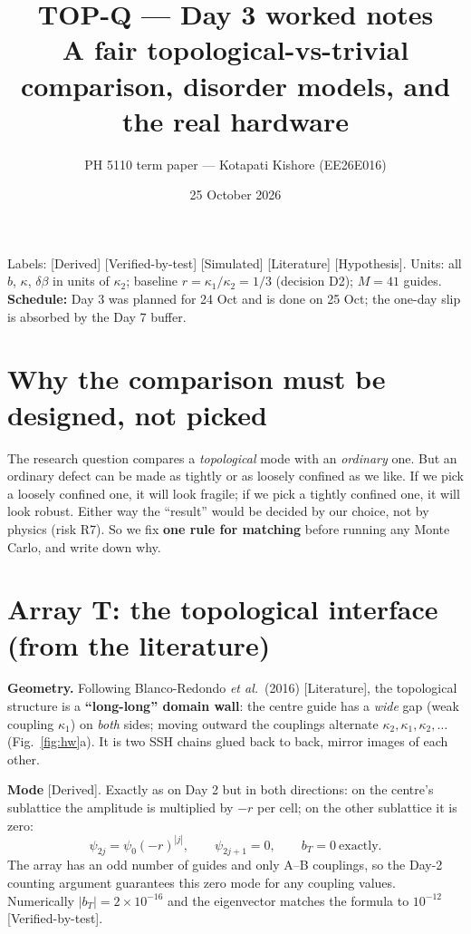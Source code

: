 \documentclass[10pt,a4paper]{article}
\title{TOP-Q --- Day 3 worked notes\\[2pt]\large A fair topological-vs-trivial comparison, disorder models, and the real hardware}
\author{PH 5110 term paper --- Kotapati Kishore (EE26E016)}
\date{25 October 2026}
\newcommand{\ka}{\kappa_1}
\newcommand{\kc}{\kappa_2}
\newcommand{\note}[1]{\par\smallskip\noindent\colorbox{gray!12}{\parbox{\dimexpr\linewidth-2\fboxsep}{\small #1}}\par\smallskip}
\newcommand{\evd}[1]{\textsf{\small[#1]}}
\begin{document}
\sloppy\maketitle

\note{Labels: \evd{Derived} \evd{Verified-by-test} \evd{Simulated} \evd{Literature} \evd{Hypothesis}.
Units: all $b$, $\kappa$, $\delta\beta$ in units of $\kc$; baseline $r=\ka/\kc=1/3$ (decision D2); $M=41$ guides.
\textbf{Schedule:} Day 3 was planned for 24 Oct and is done on 25 Oct; the one-day slip is absorbed by the Day 7 buffer.}

\tableofcontents

\section{Why the comparison must be designed, not picked}
The research question compares a \emph{topological} mode with an \emph{ordinary} one. But an ordinary defect can be made as tightly or as loosely confined as we like. If we pick a loosely confined one, it will look fragile; if we pick a tightly confined one, it will look robust. Either way the ``result'' would be decided by our choice, not by physics (risk R7). So we fix \textbf{one rule for matching} before running any Monte Carlo, and write down why.

\section{Array T: the topological interface (from the literature)}
\textbf{Geometry.} Following Blanco-Redondo \emph{et al.}\ (2016) \evd{Literature}, the topological structure is a \textbf{``long-long'' domain wall}: the centre guide has a \emph{wide} gap (weak coupling $\ka$) on \emph{both} sides; moving outward the couplings alternate $\kc,\ka,\kc,\dots$ (Fig.~\ref{fig:hw}a). It is two SSH chains glued back to back, mirror images of each other.

\textbf{Mode} \evd{Derived}. Exactly as on Day 2 but in both directions: on the centre's sublattice the amplitude is multiplied by $-r$ per cell; on the other sublattice it is zero:
\[
\psi_{2j}=\psi_0(-r)^{|j|},\qquad \psi_{2j+1}=0,\qquad b_T=0\ \text{exactly}.
\]
The array has an odd number of guides and only A--B couplings, so the Day-2 counting argument guarantees this zero mode for any coupling values. Numerically $|b_T|=2\times10^{-16}$ and the eigenvector matches the formula to $10^{-12}$ \evd{Verified-by-test}.
\end{document}
